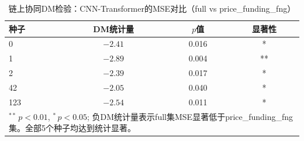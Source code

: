 \begin{table}[ht]
\centering
\small
\caption{链上协同DM检验：CNN-Transformer的MSE对比（full vs price\_funding\_fng）}
\label{tab:dm_synergy}
\begin{tabular}{lccc}
\toprule
种子 & DM统计量 & $p$值 & 显著性 \\
\midrule
0 & $-2.41$ & 0.016 & * \\
1 & $-2.89$ & 0.004 & ** \\
2 & $-2.39$ & 0.017 & * \\
42 & $-2.05$ & 0.040 & * \\
123 & $-2.54$ & 0.011 & * \\
\bottomrule
\multicolumn{4}{p{0.8\textwidth}}{\small $^{**}\,p<0.01$, $^{*}\,p<0.05$; 负DM统计量表示full集MSE显著低于price\_funding\_fng集。全部5个种子均达到统计显著。} \\
\end{tabular}
\end{table}

